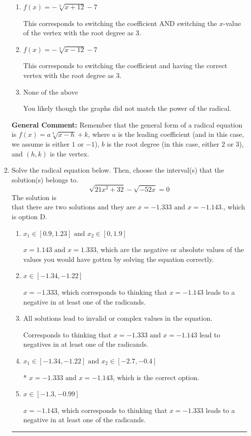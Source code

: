 \documentclass{extbook}[14pt]
\newcommand{\litem}[1]{\item #1

\rule{\textwidth}{0.4pt}}
\begin{document}
\begin{enumerate}
{\begin{enumerate}[label=\Alph*.]
* This is the correct option.
\item \( f(x) = - \sqrt[3]{x + 12} - 7 \)

This corresponds to switching the coefficient AND switching the $x$-value of the vertex with the root degree as $3$.
\item \( f(x) = - \sqrt[3]{x - 12} - 7 \)

This corresponds to switching the coefficient and having the correct vertex with the root degree as $3$.
\item \( \text{None of the above} \)

You likely though the graphs did not match the power of the radical.
\end{enumerate}

\textbf{General Comment:} Remember that the general form of a radical equation is $ f(x) = a \sqrt[b]{x - h} + k$, where $a$ is the leading coefficient (and in this case, we assume is either $1$ or $-1$), $b$ is the root degree (in this case, either $2$ or $3$), and $(h, k)$ is the vertex.
}
\litem{
Solve the radical equation below. Then, choose the interval(s) that the solution(s) belongs to.
\[ \sqrt{21 x^2 + 32} - \sqrt{-52 x} = 0 \]The solution is \( \text{that there are two solutions and they are } x = -1.333 \text{ and } x = -1.143. \), which is option D.\begin{enumerate}[label=\Alph*.]
\item \( x_1 \in [0.9, 1.23] \text{ and } x_2 \in [0,1.9] \)

$x = 1.143 \text{ and } x = 1.333$, which are the negative or absolute values of the values you would have gotten by solving the equation correctly.
\item \( x \in [-1.34,-1.22] \)

$x = -1.333$, which corresponds to thinking that $x = -1.143$ leads to a negative in at least one of the radicands.
\item \( \text{All solutions lead to invalid or complex values in the equation.} \)

Corresponds to thinking that $x = -1.333 \text{ and } x = -1.143$ lead to negatives in at least one of the radicands.
\item \( x_1 \in [-1.34, -1.22] \text{ and } x_2 \in [-2.7,-0.4] \)

* $x = -1.333 \text{ and } x = -1.143$, which is the correct option.
\item \( x \in [-1.3,-0.99] \)

$x = -1.143$, which corresponds to thinking that $x = -1.333$ leads to a negative in at least one of the radicands.
\end{enumerate}

}
\end{enumerate}
\end{document}
